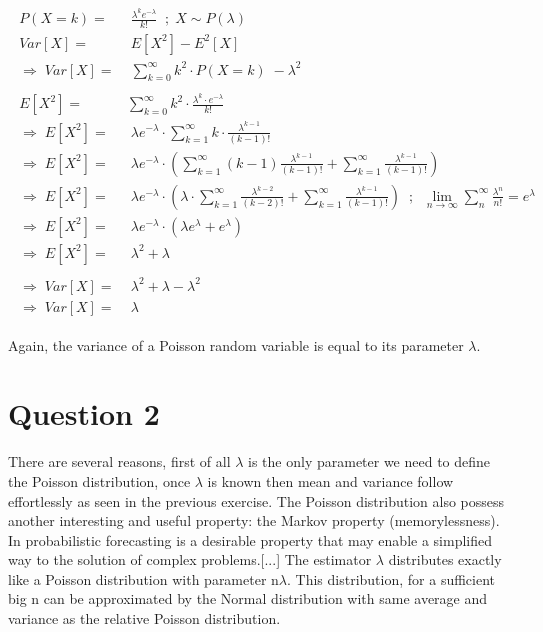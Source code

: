 \begin{align}
    \begin{split}
        P(X=k) =& \; \frac{\lambda^k e^{-\lambda}}{k!} \;\; ; \; X \sim P(\lambda) \\
        Var[X] =& \; E[X^2] - E^2[X] \\
        \Rightarrow \; Var[X] =& \; \sum_{k=0}^{\infty} k^2 \cdot P(X=k) \; - \lambda^2 \\ \\
        E[X^2] =& \sum_{k=0}^{\infty} k^2 \cdot \frac{\lambda^k \cdot e^{-\lambda}}{k!} \\
        \Rightarrow \; E[X^2] =& \; \lambda e^{-\lambda} \cdot \sum_{k=1}^{\infty} k \cdot \frac{\lambda^{k-1}}{(k-1)!} \\
        \Rightarrow \; E[X^2] =& \; \lambda e^{-\lambda} \cdot \left( \sum_{k=1}^{\infty} (k-1) \frac{\lambda^{k-1}}{(k-1)!} + \sum_{k=1}^{\infty} \frac{\lambda^{k-1}}{(k-1)!} \right) \\
        \Rightarrow \; E[X^2] =& \; \lambda e^{-\lambda} \cdot \left( \lambda \cdot \sum_{k=1}^{\infty} \frac{\lambda^{k-2}}{(k-2)!} + \sum_{k=1}^{\infty} \frac{\lambda^{k-1}}{(k-1)!} \right) \;\; ; \;\; \lim_{n \to \infty} \sum_{n}^{\infty} \frac{\lambda^n}{n!} = e^{\lambda} \\
        \Rightarrow \; E[X^2] =& \; \lambda e^{-\lambda} \cdot (\lambda e^{\lambda} + e^{\lambda}) \\
        \Rightarrow \; E[X^2] =& \; \lambda^2 + \lambda \\ \\
        \Rightarrow \; Var[X] =& \; \lambda^2 + \lambda - \lambda^2 \\
        \Rightarrow \; Var[X] =& \; \lambda
    \end{split}
\end{align}

Again, the variance of a Poisson random variable is equal to its parameter $\lambda$.

\section{Question 2}
There are several reasons, first of all $\lambda$ is the only parameter we need to define the Poisson distribution, once $\lambda$ is known then mean and variance follow effortlessly as seen in the previous exercise.
The Poisson distribution also possess another interesting and useful property: the Markov property (memorylessness). In probabilistic forecasting is a desirable property that may enable a simplified way to the solution of complex problems.[...]
The estimator $\lambda$ distributes exactly like a Poisson distribution with parameter n$\lambda$. This distribution, for a sufficient big n can be approximated by the Normal distribution with same average and variance as the relative Poisson distribution.


